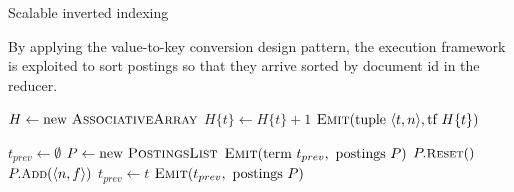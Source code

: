 \begin{algorithm}[t]
\caption{Scalable inverted indexing}
\label{algorithm:chapter-indexing:scalable}
By applying the value-to-key conversion design pattern, the execution
framework is exploited to sort postings so that they arrive sorted by
document id in the reducer.

\algrenewcommand{}
\algrenewcommand{}
  \begin{algorithmic}[1]
    \State $H \gets \textrm{new }\textsc{AssociativeArray}$
    \State $H\{t\} \gets H\{t\} + 1$
    \EndFor
    \State $\textsc{Emit}(\textrm{tuple }\langle t, n \rangle, \textrm{tf }H\{t\} )$
    \EndFor
    \EndProcedure
    \EndFunction
  \end{algorithmic}

  \begin{algorithmic}[1]
      \State $t_{prev} \gets \emptyset$
      \State $P \gets \textrm{new }\textsc{PostingsList}$
    \EndProcedure
      \State $\textsc{Emit}(\textrm{term }t_{prev}, \textrm{ postings } P)$
      \State $P.\textsc{{\small Reset}}()$
    \EndIf
    \State $P.\textsc{{\small Add}}(\langle n, f \rangle)$
    \State $t_{prev} \gets t$
    \EndProcedure
      \State $\textsc{Emit}(t_{prev}, \textrm{ postings } P)$
    \EndProcedure
    \EndFunction
  \end{algorithmic}
\end{algorithm}

